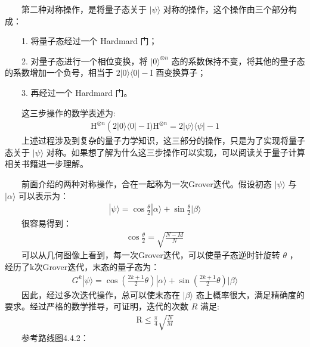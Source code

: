 \documentclass[a4paper,11pt,english]{sphinxmanual}
\begin{document}
\sphinxAtStartPar
  第二种对称操作，是将量子态关于 \(|\psi\rangle\) 对称的操作，这个操作由三个部分构成：

\sphinxAtStartPar
  1. 将量子态经过一个 Hardmard 门；

\sphinxAtStartPar
  2. 对量子态进行一个相位变换，将 \(|0\rangle^{\otimes n}\) 态的系数保持不变，将其他的量子态的系数增加一个负号，相当于 \(2|0\rangle\langle 0|-\mathrm{I}\) 酉变换算子；

\sphinxAtStartPar
  3. 再经过一个 Hardmard 门。

\sphinxAtStartPar
  这三步操作的数学表述为:
\begin{equation*}
\begin{split}\mathrm{H}^{\otimes n}\left(2|0\rangle\langle 0|-\mathrm{I}) \mathrm{H} ^{\otimes n}=2|\psi\rangle\langle\psi|-\mathrm{1}\right.\end{split}
\end{equation*}
\sphinxAtStartPar
  上述过程涉及到复杂的量子力学知识，这三部分的操作，只是为了实现将量子态关于 \(|\psi\rangle\) 对称。如果想了解为什么这三步操作可以实现，可以阅读关于量子计算相关书籍进一步理解。

\sphinxAtStartPar
  前面介绍的两种对称操作，合在一起称为一次Grover迭代。假设初态 \(|\psi\rangle\) 与  \(|\alpha\rangle\) 可以表示为：
\begin{equation*}
\begin{split}|\psi\rangle=\cos \frac{\theta}{2}|\alpha\rangle+\sin \frac{\theta}{2}|\beta\rangle\end{split}
\end{equation*}
\sphinxAtStartPar
  很容易得到：
\begin{equation*}
\begin{split}\cos \frac{\theta}{2}=\sqrt{\frac{N-M}{N}}\end{split}
\end{equation*}
\sphinxAtStartPar
  可以从几何图像上看到，每一次Grover迭代，可以使量子态逆时针旋转 \(\theta\) ，经历了k次Grover迭代，末态的量子态为：
\begin{equation*}
\begin{split}G^{k}|\psi\rangle=\cos \left(\frac{2 k+1}{2} \theta\right)|\alpha\rangle+\sin \left(\frac{2 k+1}{2} \theta\right)|\beta\rangle\end{split}
\end{equation*}
\sphinxAtStartPar
  因此，经过多次迭代操作，总可以使末态在 \(|\beta\rangle\) 态上概率很大，满足精确度的要求。经过严格的数学推导，可证明，迭代的次数  \(R\) 满足:
\begin{equation*}
\begin{split}\mathrm{R} \leq \frac{\pi}{4} \sqrt{\frac{N}{M}}\end{split}
\end{equation*}
\sphinxAtStartPar
  参考路线图4.4.2：
\end{document}
